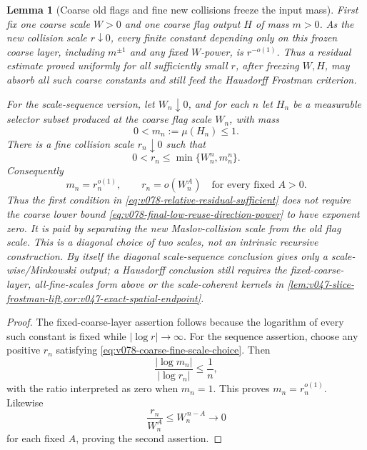 \documentclass[10pt]{article}
\newtheorem{lemma}[theorem]{Lemma}
\begin{document}
\begin{lemma}[Coarse old flags and fine new collisions freeze the input mass]
\label{lem:v078-coarse-fine-mass-freezing}
First fix one coarse scale \(W>0\) and one coarse flag output \(H\) of mass \(m>0\).  As the new
collision scale \(r\downarrow0\), every finite constant depending only on this frozen coarse layer,
including \(m^{\pm1}\) and any fixed \(W\)-power, is \(r^{-o(1)}\).  Thus a residual estimate proved
uniformly for all sufficiently small \(r\), after freezing \(W,H\), may absorb all such coarse
constants and still feed the Hausdorff Frostman criterion.

For the scale-sequence version, let \(W_n\downarrow0\), and for each \(n\) let \(H_n\) be a
measurable selector subset produced at
the coarse flag scale \(W_n\), with mass
\[
0<m_n:=\mu(H_n)\le1.
\]
There is a fine collision scale \(r_n\downarrow0\) such that
\begin{equation}
\label{eq:v078-coarse-fine-scale-choice}
\boxed{
0<r_n
\le
\min\{W_n^n,m_n^n\}.
}
\end{equation}
Consequently
\begin{equation}
\label{eq:v078-frozen-mass-is-subpower}
\boxed{
m_n=r_n^{o(1)},
\qquad
r_n=o(W_n^A)
\quad\text{for every fixed }A>0.
}
\end{equation}
Thus the first condition in \eqref{eq:v078-relative-residual-sufficient} does not require the
coarse lower bound \eqref{eq:v078-final-low-reuse-direction-power} to have exponent zero.  It is
paid by separating the new Maslov-collision scale from the old flag scale.  This is a diagonal
choice of two scales, not an intrinsic recursive construction.  By itself the diagonal
scale-sequence conclusion gives only a scale-wise/Minkowski output; a Hausdorff conclusion still
requires the fixed-coarse-layer, all-fine-scales form above or the scale-coherent kernels in
\cref{lem:v047-slice-frostman-lift,cor:v047-exact-spatial-endpoint}.
\end{lemma}

\begin{proof}
The fixed-coarse-layer assertion follows because the logarithm of every such constant is fixed
while \(|\log r|\to\infty\).  For the sequence assertion, choose any positive \(r_n\) satisfying
\eqref{eq:v078-coarse-fine-scale-choice}.  Then
\[
\frac{|\log m_n|}{|\log r_n|}
\le
\frac1n,
\]
with the ratio interpreted as zero when \(m_n=1\).  This proves
\(m_n=r_n^{o(1)}\).  Likewise
\[
\frac{r_n}{W_n^A}
\le
W_n^{\,n-A}\longrightarrow0
\]
for each fixed \(A\), proving the second assertion.
\end{proof}
\end{document}
